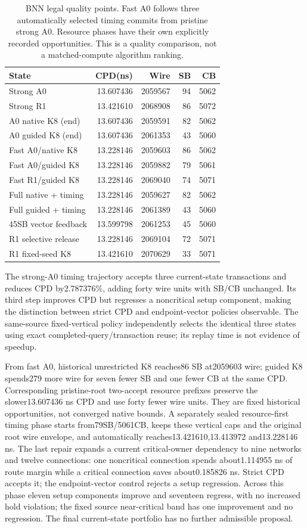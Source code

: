 \documentclass[conference,10pt]{IEEEtran}
\begin{document}
\begin{table}[t]
\centering\caption{BNN legal quality points. Fast A0 follows three automatically selected timing commits from pristine strong A0. Resource phases have their own explicitly recorded opportunities. This is a quality comparison, not a matched-compute algorithm ranking.}
\label{tab:bnn}
\small
\begin{tabular}{lrrrr}\hline
State & CPD(ns) & Wire & SB & CB\\\hline
Strong A0 &13.607436&2059567&94&5062\\
Strong R1 &13.421610&2068908&86&5072\\
A0 native K8 (end) &13.607436&2059591&82&5062\\
A0 guided K8 (end) &13.607436&2061353&43&5060\\
Fast A0/native K8 &13.228146&2059603&86&5062\\
Fast A0/guided K8 &13.228146&2059882&79&5061\\
Fast R1/guided K8 &13.228146&2069040&74&5071\\
Full native + timing &13.228146&2059627&82&5062\\
Full guided + timing &13.228146&2061389&43&5060\\
45SB vector feedback &13.599798&2061253&45&5060\\
R1 selective release &13.228146&2069104&72&5071\\
R1 fixed-seed K8 &13.421610&2070629&33&5071\\\hline
\end{tabular}
\end{table}
The strong-A0 timing trajectory accepts three current-state transactions and reduces CPD by2.787376\%, adding forty wire units with SB/CB unchanged. Its third step improves CPD but regresses a noncritical setup component, making the distinction between strict CPD and endpoint-vector policies observable. The same-source fixed-vertical policy independently selects the identical three states using exact completed-query/transaction reuse; its replay time is not evidence of speedup.

From fast A0, historical unrestricted K8 reaches86 SB at2059603 wire; guided K8 spends279 more wire for seven fewer SB and one fewer CB at the same CPD. Corresponding pristine-root two-accept resource prefixes preserve the slower13.607436 ns CPD and use forty fewer wire units. They are fixed historical opportunities, not converged native bounds. A separately sealed resource-first timing phase starts from79SB/5061CB, keeps these vertical caps and the original root wire envelope, and automatically reaches13.421610,13.413972 and13.228146 ns. The last repair expands a current critical-owner dependency to nine networks and twelve connections: one noncritical connection spends about1.114955 ns of route margin while a critical connection saves about0.185826 ns. Strict CPD accepts it; the endpoint-vector control rejects a setup regression. Across this phase eleven setup components improve and seventeen regress, with no increased hold violation; the fixed source near-critical band has one improvement and no regression. The final current-state portfolio has no further admissible proposal.
\end{document}

